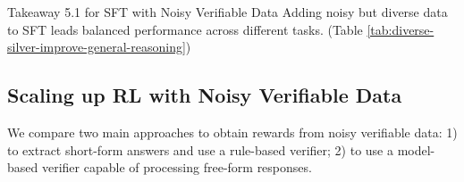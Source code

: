 \begin{table}[htbp]
\vspace{-10pt}
\caption{
Adding data with a silver supervision signal is often beneficial.
``WebIT'' is the abbreviation of WebInstruct.
}
\vspace{5pt}
\label{tab:diverse-silver-improve-general-reasoning}
\centering
\small
{}
\end{table}

\begin{AIbox}{Takeaway 5.1 for SFT with Noisy Verifiable Data}
Adding noisy but diverse data to SFT leads balanced performance across different tasks. (Table \ref{tab:diverse-silver-improve-general-reasoning})
\end{AIbox}

\subsection{Scaling up RL with Noisy Verifiable Data}
\label{result:reward-verify-clean}

We compare two main approaches to obtain rewards from noisy verifiable data: 1) to extract short-form answers and use a rule-based verifier; 2) to use a model-based verifier capable of processing free-form responses. 

